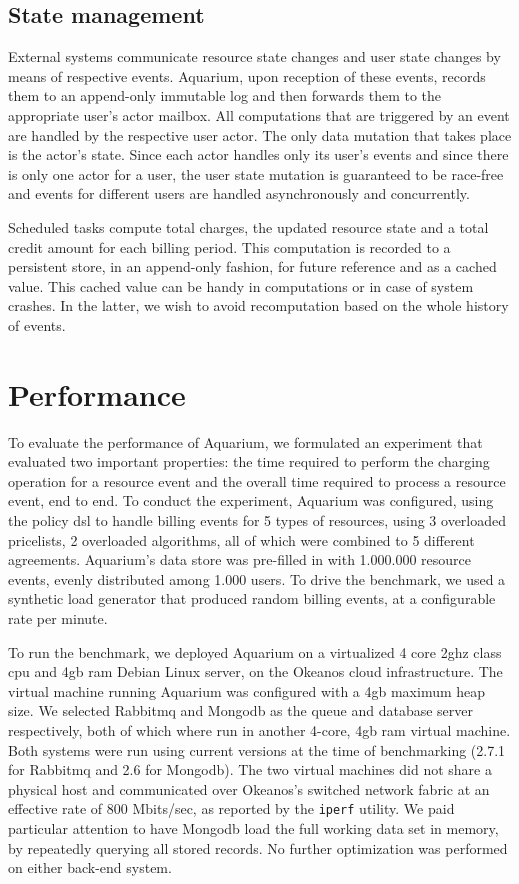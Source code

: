 \documentclass[preprint,10pt]{sigplanconf}
\begin{document}
\subsection{State management}

External systems communicate resource state changes and user state changes by means of respective events. Aquarium, upon reception of these events, records them to an append-only immutable log and then forwards them to the appropriate user's actor mailbox. All computations that are triggered by an event are handled by the respective user actor. The only data mutation that takes place is the actor's state. Since each actor handles only its user's events and since there is only one actor for a user, the user state mutation is guaranteed to be race-free and events for different users are handled asynchronously and concurrently.

Scheduled tasks compute total charges, the updated resource state and a total credit amount for each billing period. This computation is recorded to a persistent store, in an append-only fashion, for future reference and as a cached value. This cached value can be handy in computations or in case of system crashes. In the latter, we wish to avoid recomputation based on the whole history of events.

\section{Performance}

To evaluate the performance of Aquarium, we formulated an experiment that
evaluated two important properties: the time required to perform the charging
operation for a resource event and the overall time required to process a
resource event, end to end. To conduct the experiment, Aquarium was configured,
using the policy {\sc dsl} to handle billing events for 5 types of resources,
using 3 overloaded pricelists, 2 overloaded algorithms, all of which were
combined to 5 different agreements. Aquarium's data store was pre-filled in
with 1.000.000 resource events, evenly distributed among 1.000 users. To drive
the benchmark, we used a synthetic load generator that produced random
billing events, at a configurable rate per minute. 

To run the benchmark, we deployed Aquarium on a virtualized 4 core 2{\sc gh}z
class {\sc cpu} and 4{\sc gb} {\sc ram} Debian Linux server, on the Okeanos
cloud infrastructure. The virtual machine running Aquarium was configured with
a 4{\sc gb} maximum heap size. We selected Rabbit{\sc mq} and Mongo{\sc db} as
the queue and database server respectively, both of which where run in another
4-core, 4{\sc gb ram} virtual machine. Both systems were run using current
versions at the time of benchmarking (2.7.1 for Rabbit{\sc mq} and 2.6 for
Mongo{\sc db}). The two virtual machines did not share a physical host and
communicated over Okeanos's switched network fabric at an effective rate of 800
Mbits/sec, as reported by the \texttt{iperf} utility.  We paid particular
attention to have Mongo{\sc db} load the full working data set in memory, by
repeatedly querying all stored records. No further optimization was performed
on either back-end system.
\end{document}
